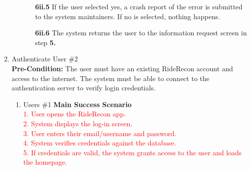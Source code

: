 \documentclass[]{article}
\begin{document}
\begin{enumerate}[label={\bf BE\arabic*.}]
\begin{enumerate}
\begin{enumerate}
				\item[\textbf{6ii.5}] If the user selected yes, a crash report of the error is submitted to the system maintainers. If no is selected, nothing happens.
				\item[\textbf{6ii.6}] The system returns the user to the information request screen in step \textbf{5.}
			\end{enumerate}
		\end{enumerate}
	\item Authenticate User \#2 \\
	\textbf{Pre-Condition:} The user must have an existing RideRecon account and access to the internet. The system must be able to connect to the authentication server to verify login credentials.
	\begin{enumerate}[label={\bf VP\arabic*.}]
		\item Users \#1 
			\textbf{Main Success Scenario} \\  
			\textcolor{red}{1. User opens the RideRecon app.} \\  
			\textcolor{red}{2. System displays the log-in screen.} \\  
			\textcolor{red}{3. User enters their email/username and password.} \\  
			\textcolor{red}{4. System verifies credentials against the database.} \\  
			\textcolor{red}{5. If credentials are valid, the system grants access to the user and loads the homepage.} \\


\end{enumerate}
\end{enumerate}
\end{document}
